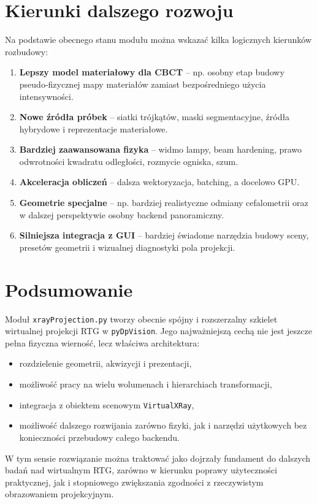 \documentclass[12pt,a4paper]{article}
\begin{document}
\section{Kierunki dalszego rozwoju}

Na podstawie obecnego stanu modułu można wskazać kilka logicznych kierunków rozbudowy:
\begin{enumerate}[label=\arabic*.]
  \item \textbf{Lepszy model materiałowy dla CBCT} -- np. osobny etap budowy
        pseudo-fizycznej mapy materiałów zamiast bezpośredniego użycia intensywności.
  \item \textbf{Nowe źródła próbek} -- siatki trójkątów, maski segmentacyjne,
        źródła hybrydowe i reprezentacje materiałowe.
  \item \textbf{Bardziej zaawansowana fizyka} -- widmo lampy, beam hardening,
        prawo odwrotności kwadratu odległości, rozmycie ogniska, szum.
  \item \textbf{Akceleracja obliczeń} -- dalsza wektoryzacja, batching, a docelowo GPU.
  \item \textbf{Geometrie specjalne} -- np. bardziej realistyczne odmiany cefalometrii
        oraz w dalszej perspektywie osobny backend panoramiczny.
  \item \textbf{Silniejsza integracja z GUI} -- bardziej świadome narzędzia budowy sceny,
        presetów geometrii i wizualnej diagnostyki pola projekcji.
\end{enumerate}

\section{Podsumowanie}

Moduł \texttt{xrayProjection.py} tworzy obecnie spójny i rozszerzalny szkielet
wirtualnej projekcji RTG w \texttt{pyDpVision}. Jego najważniejszą cechą nie jest
jeszcze pełna fizyczna wierność, lecz właściwa architektura:
\begin{itemize}
  \item rozdzielenie geometrii, akwizycji i prezentacji,
  \item możliwość pracy na wielu wolumenach i hierarchiach transformacji,
  \item integracja z obiektem scenowym \texttt{VirtualXRay},
  \item możliwość dalszego rozwijania zarówno fizyki, jak i narzędzi użytkowych
        bez konieczności przebudowy całego backendu.
\end{itemize}

W tym sensie rozwiązanie można traktować jako dojrzały fundament do dalszych badań
nad wirtualnym RTG, zarówno w kierunku poprawy użyteczności praktycznej, jak i
stopniowego zwiększania zgodności z rzeczywistym obrazowaniem projekcyjnym.
\end{document}
